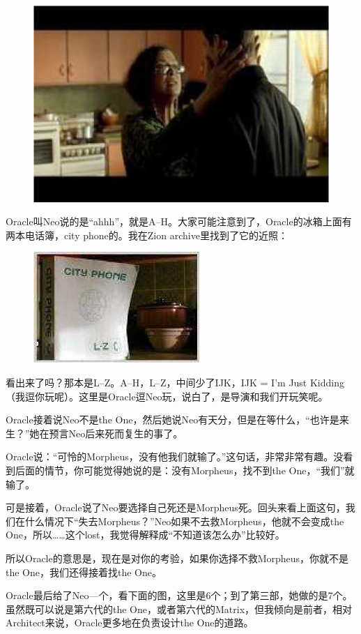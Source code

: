 \documentclass[UTF8]{ctexart}
\begin{document}
\begin{figure}[htb]
\centering
\includegraphics[width=0.5\linewidth]{fig/read_Matrix-49}
\end{figure}

Oracle叫Neo说的是“ahhh”，就是A--H。大家可能注意到了，Oracle的冰箱上面有两本电话簿，city phone的。我在Zion archive里找到了它的近照：

\begin{figure}[htb]
\centering
\includegraphics[width=0.5\linewidth]{fig/read_Matrix-50}
\end{figure}

看出来了吗？那本是L--Z。A--H，L--Z，中间少了IJK，IJK = I'm Just Kidding（我逗你玩呢）。这里是Oracle逗Neo玩，说白了，是导演和我们开玩笑呢。

Oracle接着说Neo不是the One，然后她说Neo有天分，但是在等什么，“也许是来生？”她在预言Neo后来死而复生的事了。

Oracle说：“可怜的Morpheus，没有他我们就输了。”这句话，非常非常有趣。没看到后面的情节，你可能觉得她说的是：没有Morpheus，找不到the One，“我们”就输了。

可是接着，Oracle说了Neo要选择自己死还是Morpheus死。回头来看上面这句，我们在什么情况下“失去Morpheus？”Neo如果不去救Morpheus，他就不会变成the One，所以……这个lost，我觉得解释成“不知道该怎么办”比较好。

所以Oracle的意思是，现在是对你的考验，如果你选择不救Morpheus，你就不是the One，我们还得接着找the One。

Oracle最后给了Neo—个，看下面的图，这里是6个；到了第三部，她做的是7个。虽然既可以说是第六代的the One，或者第六代的Matrix，但我倾向是前者，相对Architect来说，Oracle更多地在负责设计the One的道路。
\end{document}
